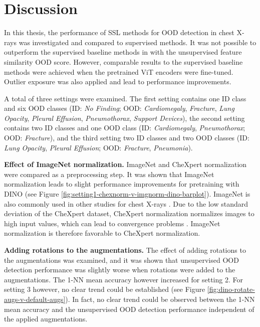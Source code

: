 \section{Discussion}
\label{section: discussion}
In this thesis, the performance of SSL methods for OOD detection in chest X-rays was investigated and compared to supervised methods.
It was not possible to outperform the supervised baseline methods in \citep{Berger2021} with the unsupervised feature similarity OOD score.
However, comparable results to the supervised baseline methods were achieved when the pretrained ViT encoders were fine-tuned.
Outlier exposure was also applied and lead to performance improvements.
\par
A total of three settings were examined.
The first setting contains one ID class and six OOD classes (ID: \textit{No Finding}; OOD: \textit{Cardiomegaly}, \textit{Fracture}, \textit{Lung Opacity}, \textit{Pleural Effusion}, \textit{Pneumothorax}, \textit{Support Devices}), the second setting contains two ID classes and one OOD class (ID: \textit{Cardiomegaly}, \textit{Pneumothorax}; OOD: \textit{Fracture}), and the third setting two ID classes and two OOD classes (ID: \textit{Lung Opacity}, \textit{Pleural Effusion}; OOD: \textit{Fracture}, \textit{Pneumonia}).
\par
\textbf{Effect of ImageNet normalization.} ImageNet and CheXpert normalization were compared as a preprocessing step.
It was shown that ImageNet normalization leads to slight performance improvements for pretraining with DINO (see Figure \ref{fig:setting1-chexnorm-v-imgnorm-dino-barplot}).
ImageNet is also commonly used in other studies for chest X-rays \citep{Azizi2021,Pham2020}.
Due to the low standard deviation of the CheXpert dataset, CheXpert normalization normalizes images to high input values, which can lead to convergence problems \citep{Lecun2002, He2015, Santurkar2019}.
ImageNet normalization is therefore favorable to CheXpert normalization.
\par
\textbf{Adding rotations to the augmentations.}
The effect of adding rotations to the augmentations was examined, and it was shown that unsupervised OOD detection performance was slightly worse when rotations were added to the augmentations.
The 1-NN mean accuracy however increased for setting 2.
For setting 3 however, no clear trend could be established (see Figure \ref{fig:dino-rotate-augs-v-default-augs}).
In fact, no clear trend could be observed between the 1-NN mean accuracy and the unsupervised OOD detection performance independent of the applied augmentations.
